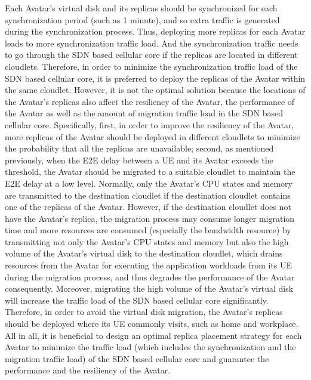 \documentclass[journal,12pt,draftclsnofoot,onecolumn]{IEEEtran}
\begin{document}
Each Avatar's virtual disk and its replicas should be synchronized for each synchronization period (such as 1 minute), and so extra traffic is generated during the synchronization process. Thus, deploying more replicas for each Avatar leads to more synchronization traffic load. And the synchronization traffic needs to go through the SDN based cellular core if the replicas are located in different cloudlets. Therefore, in order to minimize the synchronization traffic load of the SDN based cellular core, it is preferred to deploy the replicas of the Avatar within the same cloudlet. However, it is not the optimal solution because the locations of the Avatar's replicas also affect the resiliency of the Avatar, the performance of the Avatar as well as the amount of migration traffic load in the SDN based cellular core. Specifically, first, in order to improve the resiliency of the Avatar, more replicas of the Avatar should be deployed in different cloudlets to minimize the probability that all the replicas are unavailable; second, as mentioned previously, when the E2E delay between a UE and its Avatar exceeds the threshold, the Avatar should be migrated to a suitable cloudlet to maintain the E2E delay at a low level. Normally, only the Avatar's CPU states and memory are transmitted to the destination cloudlet if the destination cloudlet contains one of the replicas of the Avatar. However, if the destination cloudlet does not have the Avatar's replica, the migration process may consume longer migration time and more resources are consumed (especially the bandwidth resource) by transmitting not only the Avatar's CPU states and memory but also the high volume of the Avatar's virtual disk to the destination cloudlet, which drains resources from the Avatar for executing the application workloads from its UE during the migration process, and thus degrades the performance of the Avatar consequently. Moreover, migrating the high volume of the Avatar's virtual disk will increase the traffic load of the SDN based cellular core significantly. Therefore, in order to avoid the virtual disk migration, the Avatar's replicas should be deployed where its UE commonly visits, such as home and workplace. All in all, it is beneficial to design an optimal replica placement strategy for each Avatar to minimize the traffic load (which includes the synchronization and the migration traffic load) of the SDN based cellular core and guarantee the performance and the resiliency of the Avatar.
\end{document}
